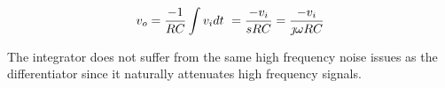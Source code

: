 \textcolor{red}{
\begin{equation}
v_o = \frac{-1}{RC}\int v_i dt\ = \frac{-v_i}{sRC} = \frac{-v_i}{\jmath \omega RC}
\label{eq:integrator}
\end{equation}
}

The integrator does not suffer from the same high frequency noise issues as the differentiator since it naturally attenuates high frequency signals.


